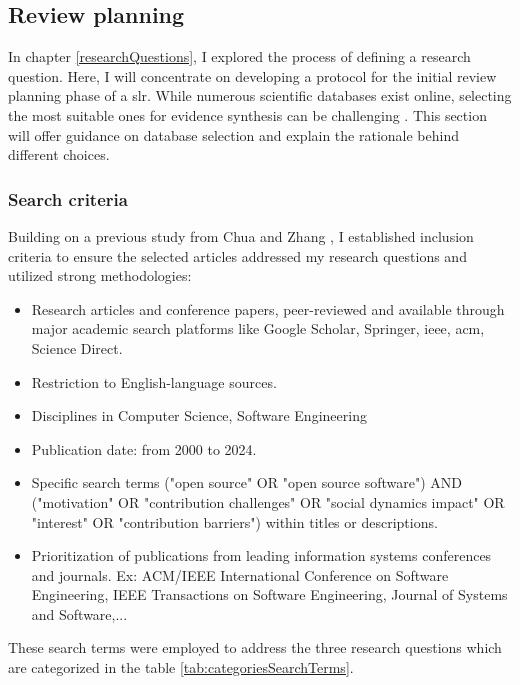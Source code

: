 \subsection{Review planning}

In chapter \ref{researchQuestions}, I explored the process of defining a research question. Here, I will concentrate on developing a protocol for the initial review planning phase of a \ac{slr}. While numerous scientific databases exist online, selecting the most suitable ones for evidence synthesis can be challenging \cite{academicSearchSystems}. This section will offer guidance on database selection and explain the rationale behind different choices.



\subsubsection{Search criteria}
Building on a previous study from Chua and Zhang \cite{Chua_Zhang_2020}, I established inclusion criteria to ensure the selected articles addressed my research questions and utilized strong methodologies:

\begin{itemize}
    \item Research articles and conference papers, peer-reviewed and available through major academic search platforms like Google Scholar, Springer, \ac{ieee}, \ac{acm}, Science Direct.
    \item Restriction to English-language sources.
    \item Disciplines in Computer Science, Software Engineering
    \item Publication date: from 2000 to 2024.
    \item Specific search terms ("open source" OR "open source software") AND ("motivation" OR "contribution challenges" OR "social dynamics impact" OR "interest" OR "contribution barriers") within titles or descriptions.
    \item Prioritization of publications from leading information systems conferences and journals. Ex: ACM/IEEE International Conference on Software Engineering, IEEE Transactions on Software Engineering, Journal of Systems and Software,...
\end{itemize}

These search terms were employed to address the three research questions which are categorized in the table \ref{tab:categoriesSearchTerms}.

